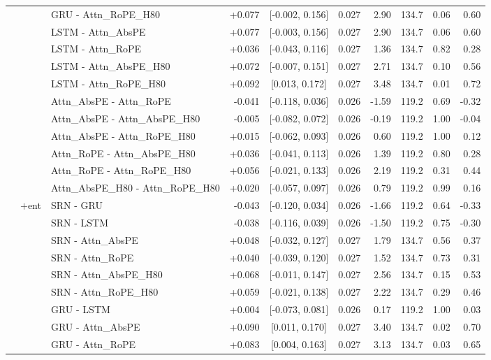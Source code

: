 \begin{longtable}{@{}lllrcrrrrr@{}}
 &  & GRU - Attn\_RoPE\_H80 & +0.077 & [-0.002, 0.156] & 0.027 & 2.90 & 134.7 & 0.06 & 0.60 \\
 &  & LSTM - Attn\_AbsPE & +0.077 & [-0.003, 0.156] & 0.027 & 2.90 & 134.7 & 0.06 & 0.60 \\
 &  & LSTM - Attn\_RoPE & +0.036 & [-0.043, 0.116] & 0.027 & 1.36 & 134.7 & 0.82 & 0.28 \\
 &  & LSTM - Attn\_AbsPE\_H80 & +0.072 & [-0.007, 0.151] & 0.027 & 2.71 & 134.7 & 0.10 & 0.56 \\
 &  & LSTM - Attn\_RoPE\_H80 & +0.092 & [0.013, 0.172] & 0.027 & 3.48 & 134.7 & 0.01 & 0.72 \\
 &  & Attn\_AbsPE - Attn\_RoPE & -0.041 & [-0.118, 0.036] & 0.026 & -1.59 & 119.2 & 0.69 & -0.32 \\
 &  & Attn\_AbsPE - Attn\_AbsPE\_H80 & -0.005 & [-0.082, 0.072] & 0.026 & -0.19 & 119.2 & 1.00 & -0.04 \\
 &  & Attn\_AbsPE - Attn\_RoPE\_H80 & +0.015 & [-0.062, 0.093] & 0.026 & 0.60 & 119.2 & 1.00 & 0.12 \\
 &  & Attn\_RoPE - Attn\_AbsPE\_H80 & +0.036 & [-0.041, 0.113] & 0.026 & 1.39 & 119.2 & 0.80 & 0.28 \\
 &  & Attn\_RoPE - Attn\_RoPE\_H80 & +0.056 & [-0.021, 0.133] & 0.026 & 2.19 & 119.2 & 0.31 & 0.44 \\
 &  & Attn\_AbsPE\_H80 - Attn\_RoPE\_H80 & +0.020 & [-0.057, 0.097] & 0.026 & 0.79 & 119.2 & 0.99 & 0.16 \\
\addlinespace[2pt]
 & $+$ent & SRN - GRU & -0.043 & [-0.120, 0.034] & 0.026 & -1.66 & 119.2 & 0.64 & -0.33 \\
 &  & SRN - LSTM & -0.038 & [-0.116, 0.039] & 0.026 & -1.50 & 119.2 & 0.75 & -0.30 \\
 &  & SRN - Attn\_AbsPE & +0.048 & [-0.032, 0.127] & 0.027 & 1.79 & 134.7 & 0.56 & 0.37 \\
 &  & SRN - Attn\_RoPE & +0.040 & [-0.039, 0.120] & 0.027 & 1.52 & 134.7 & 0.73 & 0.31 \\
 &  & SRN - Attn\_AbsPE\_H80 & +0.068 & [-0.011, 0.147] & 0.027 & 2.56 & 134.7 & 0.15 & 0.53 \\
 &  & SRN - Attn\_RoPE\_H80 & +0.059 & [-0.021, 0.138] & 0.027 & 2.22 & 134.7 & 0.29 & 0.46 \\
 &  & GRU - LSTM & +0.004 & [-0.073, 0.081] & 0.026 & 0.17 & 119.2 & 1.00 & 0.03 \\
 &  & GRU - Attn\_AbsPE & +0.090 & [0.011, 0.170] & 0.027 & 3.40 & 134.7 & 0.02 & 0.70 \\
 &  & GRU - Attn\_RoPE & +0.083 & [0.004, 0.163] & 0.027 & 3.13 & 134.7 & 0.03 & 0.65 \\

\end{longtable}
